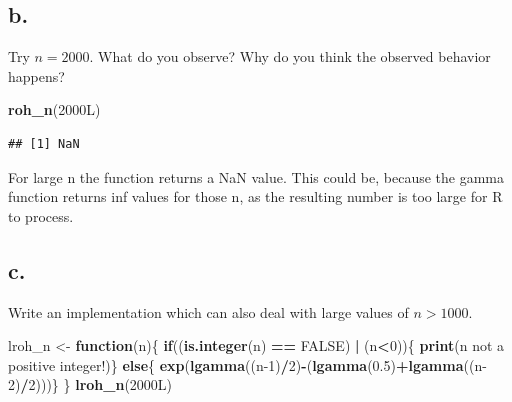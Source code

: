 \documentclass[
]{article}
\newenvironment{Shaded}{\begin{snugshade}}{\end{snugshade}}
\newcommand{\ConstantTok}[1]{\textcolor[rgb]{0.56,0.35,0.01}{#1}}
\newcommand{\ControlFlowTok}[1]{\textcolor[rgb]{0.13,0.29,0.53}{\textbf{#1}}}
\newcommand{\DataTypeTok}[1]{\textcolor[rgb]{0.13,0.29,0.53}{#1}}
\newcommand{\DecValTok}[1]{\textcolor[rgb]{0.00,0.00,0.81}{#1}}
\newcommand{\FloatTok}[1]{\textcolor[rgb]{0.00,0.00,0.81}{#1}}
\newcommand{\FunctionTok}[1]{\textcolor[rgb]{0.13,0.29,0.53}{\textbf{#1}}}
\newcommand{\NormalTok}[1]{#1}
\newcommand{\OtherTok}[1]{\textcolor[rgb]{0.56,0.35,0.01}{#1}}
\newcommand{\SpecialCharTok}[1]{\textcolor[rgb]{0.81,0.36,0.00}{\textbf{#1}}}
\newcommand{\StringTok}[1]{\textcolor[rgb]{0.31,0.60,0.02}{#1}}
\begin{document}
\subsection{b.}\label{b.-1}

Try \(n = 2000\). What do you observe? Why do you think the observed
behavior happens?

\begin{Shaded}
\begin{Highlighting}[]
\FunctionTok{roh\_n}\NormalTok{(}\DecValTok{2000}\DataTypeTok{L}\NormalTok{)}
\end{Highlighting}
\end{Shaded}

\begin{verbatim}
## [1] NaN
\end{verbatim}

For large n the function returns a NaN value. This could be, because the
gamma function returns inf values for those n, as the resulting number
is too large for R to process.

\subsection{c.}\label{c.-1}

Write an implementation which can also deal with large values of
\(n>1000\).

\begin{Shaded}
\begin{Highlighting}[]
\NormalTok{lroh\_n }\OtherTok{\textless{}{-}} \ControlFlowTok{function}\NormalTok{(n)\{}
  \ControlFlowTok{if}\NormalTok{((}\FunctionTok{is.integer}\NormalTok{(n) }\SpecialCharTok{==} \ConstantTok{FALSE}\NormalTok{) }\SpecialCharTok{|}\NormalTok{ (n}\SpecialCharTok{\textless{}}\DecValTok{0}\NormalTok{))\{}
    \FunctionTok{print}\NormalTok{(}\StringTok{\textquotesingle{}n not a positive integer!\textquotesingle{}}\NormalTok{)\}}
  \ControlFlowTok{else}\NormalTok{\{}
    \FunctionTok{exp}\NormalTok{(}\FunctionTok{lgamma}\NormalTok{((n}\DecValTok{{-}1}\NormalTok{)}\SpecialCharTok{/}\DecValTok{2}\NormalTok{)}\SpecialCharTok{{-}}\NormalTok{(}\FunctionTok{lgamma}\NormalTok{(}\FloatTok{0.5}\NormalTok{)}\SpecialCharTok{+}\FunctionTok{lgamma}\NormalTok{((n}\DecValTok{{-}2}\NormalTok{)}\SpecialCharTok{/}\DecValTok{2}\NormalTok{)))\}}
\NormalTok{\}}
\FunctionTok{lroh\_n}\NormalTok{(}\DecValTok{2000}\DataTypeTok{L}\NormalTok{)}
\end{Highlighting}
\end{Shaded}
\end{document}
